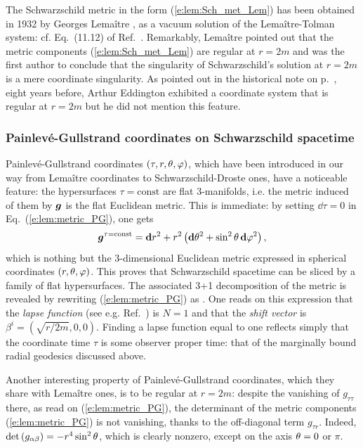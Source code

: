 \begin{hist}
The Schwarzschild metric in the form (\ref{e:lem:Sch_met_Lem}) has
been obtained in 1932 by Georges Lemaître \cite{Lemai32},
as a vacuum solution of the Lemaître-Tolman system: cf. Eq.~(11.12) of Ref.~\cite{Lemai32}.
Remarkably, Lemaître pointed out that the metric components (\ref{e:lem:Sch_met_Lem}) are
regular at $r=2m$ and was the first author to conclude that the singularity of
Schwarzschild's solution at $r=2m$ is a mere coordinate singularity.
As pointed out in the historical note on p.~\pageref{n:sch:Eddington_coord}, eight years before,
Arthur Eddington \cite{Eddin1924} exhibited a
coordinate system that is regular at $r=2m$ but he
did not mention this feature.
\end{hist}

\subsubsection{Painlevé-Gullstrand coordinates on Schwarzschild spacetime}

Painlevé-Gullstrand coordinates $(\tau,r,\theta,\varphi)$,
which have been introduced
in our way from Lemaître coordinates to Schwarzschild-Droste ones,
have a noticeable feature: the hypersurfaces $\tau=\mathrm{const}$ are
flat 3-manifolds, i.e. the metric induced of them by $\bm{g}$ is the flat Euclidean metric.
This is immediate: by setting $\dd\tau=0$ in Eq.~(\ref{e:lem:metric_PG}), one gets
\[
    \bm{g}^{\tau=\mathrm{const}} = \mathbf{d} r^2 + r^2 \left( \mathbf{d}\theta^2 + \sin^2\theta\, \mathbf{d}\varphi^2 \right) ,
\]
which is nothing but the 3-dimensional Euclidean metric expressed in spherical coordinates
$(r,\theta,\varphi)$. This proves that Schwarzschild spacetime can be sliced
by a family of flat hypersurfaces. The associated 3+1 decomposition
of the metric is revealed by rewriting (\ref{e:lem:metric_PG})
as
\be
        .
\ee
One reads on this expression that the \emph{lapse function}
(see e.g. Ref.~\cite{Gourg12}) is $N=1$ and that the \emph{shift vector}
is $\beta^i = (\sqrt{r/2m},0,0)$. Finding a lapse function equal to one reflects simply
that the coordinate time $\tau$ is some observer proper time: that of the
marginally bound radial geodesics discussed above.

Another interesting property of Painlevé-Gullstrand coordinates, which they
share with Lemaître ones, is to be regular at $r=2m$: despite the vanishing of
$g_{\tau\tau}$ there, as read on (\ref{e:lem:metric_PG}), the determinant
of the metric components (\ref{e:lem:metric_PG}) is not vanishing,
thanks to the off-diagonal term $g_{\tau r}$. Indeed, $\det\left( g_{\alpha\beta}\right) = -r^4\sin^2\theta$, which is clearly nonzero, except on the
axis $\theta=0$ or $\pi$.

